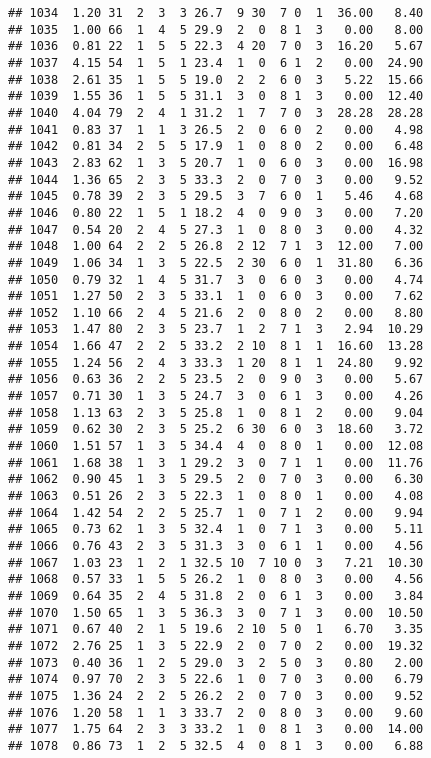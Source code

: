 \documentclass[
]{article}
\begin{document}
\begin{verbatim}
## 1034  1.20 31  2  3  3 26.7  9 30  7 0  1  36.00   8.40
## 1035  1.00 66  1  4  5 29.9  2  0  8 1  3   0.00   8.00
## 1036  0.81 22  1  5  5 22.3  4 20  7 0  3  16.20   5.67
## 1037  4.15 54  1  5  1 23.4  1  0  6 1  2   0.00  24.90
## 1038  2.61 35  1  5  5 19.0  2  2  6 0  3   5.22  15.66
## 1039  1.55 36  1  5  5 31.1  3  0  8 1  3   0.00  12.40
## 1040  4.04 79  2  4  1 31.2  1  7  7 0  3  28.28  28.28
## 1041  0.83 37  1  1  3 26.5  2  0  6 0  2   0.00   4.98
## 1042  0.81 34  2  5  5 17.9  1  0  8 0  2   0.00   6.48
## 1043  2.83 62  1  3  5 20.7  1  0  6 0  3   0.00  16.98
## 1044  1.36 65  2  3  5 33.3  2  0  7 0  3   0.00   9.52
## 1045  0.78 39  2  3  5 29.5  3  7  6 0  1   5.46   4.68
## 1046  0.80 22  1  5  1 18.2  4  0  9 0  3   0.00   7.20
## 1047  0.54 20  2  4  5 27.3  1  0  8 0  3   0.00   4.32
## 1048  1.00 64  2  2  5 26.8  2 12  7 1  3  12.00   7.00
## 1049  1.06 34  1  3  5 22.5  2 30  6 0  1  31.80   6.36
## 1050  0.79 32  1  4  5 31.7  3  0  6 0  3   0.00   4.74
## 1051  1.27 50  2  3  5 33.1  1  0  6 0  3   0.00   7.62
## 1052  1.10 66  2  4  5 21.6  2  0  8 0  2   0.00   8.80
## 1053  1.47 80  2  3  5 23.7  1  2  7 1  3   2.94  10.29
## 1054  1.66 47  2  2  5 33.2  2 10  8 1  1  16.60  13.28
## 1055  1.24 56  2  4  3 33.3  1 20  8 1  1  24.80   9.92
## 1056  0.63 36  2  2  5 23.5  2  0  9 0  3   0.00   5.67
## 1057  0.71 30  1  3  5 24.7  3  0  6 1  3   0.00   4.26
## 1058  1.13 63  2  3  5 25.8  1  0  8 1  2   0.00   9.04
## 1059  0.62 30  2  3  5 25.2  6 30  6 0  3  18.60   3.72
## 1060  1.51 57  1  3  5 34.4  4  0  8 0  1   0.00  12.08
## 1061  1.68 38  1  3  1 29.2  3  0  7 1  1   0.00  11.76
## 1062  0.90 45  1  3  5 29.5  2  0  7 0  3   0.00   6.30
## 1063  0.51 26  2  3  5 22.3  1  0  8 0  1   0.00   4.08
## 1064  1.42 54  2  2  5 25.7  1  0  7 1  2   0.00   9.94
## 1065  0.73 62  1  3  5 32.4  1  0  7 1  3   0.00   5.11
## 1066  0.76 43  2  3  5 31.3  3  0  6 1  1   0.00   4.56
## 1067  1.03 23  1  2  1 32.5 10  7 10 0  3   7.21  10.30
## 1068  0.57 33  1  5  5 26.2  1  0  8 0  3   0.00   4.56
## 1069  0.64 35  2  4  5 31.8  2  0  6 1  3   0.00   3.84
## 1070  1.50 65  1  3  5 36.3  3  0  7 1  3   0.00  10.50
## 1071  0.67 40  2  1  5 19.6  2 10  5 0  1   6.70   3.35
## 1072  2.76 25  1  3  5 22.9  2  0  7 0  2   0.00  19.32
## 1073  0.40 36  1  2  5 29.0  3  2  5 0  3   0.80   2.00
## 1074  0.97 70  2  3  5 22.6  1  0  7 0  3   0.00   6.79
## 1075  1.36 24  2  2  5 26.2  2  0  7 0  3   0.00   9.52
## 1076  1.20 58  1  1  3 33.7  2  0  8 0  3   0.00   9.60
## 1077  1.75 64  2  3  3 33.2  1  0  8 1  3   0.00  14.00
## 1078  0.86 73  1  2  5 32.5  4  0  8 1  3   0.00   6.88

\end{verbatim}
\end{document}
